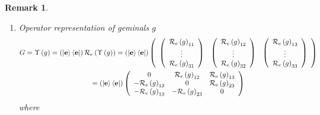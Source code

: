 \documentclass[aps,preprint]{revtex4}%
\newtheorem{remark}[theorem]{Remark}
\begin{document}
\begin{remark}
\begin{enumerate}
\item Operator representation of geminals $g$%
\begin{gather}
G=\Upsilon\left(  g\right)  =\left(  \left\vert \mathbf{e}\right\rangle
\left\langle \mathbf{e}\right\vert \right)  \mathcal{R}_{e}\left(
\Upsilon\left(  g\right)  \right)  =\left(  \left\vert \mathbf{e}\right\rangle
\left\langle \mathbf{e}\right\vert \right)  \left(
\begin{array}
[c]{ccc}%
\left(
\begin{array}
[c]{c}%
\mathcal{R}_{e}\left(  g\right)  _{11}\\
\vdots\\
\mathcal{R}_{e}\left(  g\right)  _{31}%
\end{array}
\right)  & \left(
\begin{array}
[c]{c}%
\mathcal{R}_{e}\left(  g\right)  _{12}\\
\vdots\\
\mathcal{R}_{e}\left(  g\right)  _{32}%
\end{array}
\right)  & \left(
\begin{array}
[c]{c}%
\mathcal{R}_{e}\left(  g\right)  _{13}\\
\vdots\\
\mathcal{R}_{e}\left(  g\right)  _{33}%
\end{array}
\right)
\end{array}
\right) \\
=\left(  \left\vert \mathbf{e}\right\rangle \left\langle \mathbf{e}\right\vert
\right)  \left(
\begin{array}
[c]{ccc}%
0 & \mathcal{R}_{e}\left(  g\right)  _{12} & \mathcal{R}_{e}\left(  g\right)
_{13}\\
-\mathcal{R}_{e}\left(  g\right)  _{13} & 0 & \mathcal{R}_{e}\left(  g\right)
_{23}\\
-\mathcal{R}_{e}\left(  g\right)  _{13} & -\mathcal{R}_{e}\left(  g\right)
_{23} & 0
\end{array}
\right)
\end{gather}
where


\end{enumerate}
\end{remark}
\end{document}
